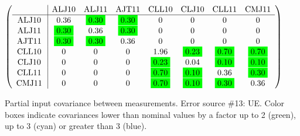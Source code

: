 \begin{table}[H]
\scriptsize
\begin{center}
\renewcommand{\arraystretch}{1.1}
\begin{math}\left(\begin{array}{c|ccccccc}
 & \mathrm{ALJ10} & 
\mathrm{ALJ11} & 
\mathrm{AJT11} & 
\mathrm{CLL10} & 
\mathrm{CLJ10} & 
\mathrm{CLL11} & 
\mathrm{CMJ11} \\
\hline
\mathrm{ALJ10} \hspace*{2pt} &       0.36 &  \colorbox{Green1}{$      0.30$} &  \colorbox{Green1}{$      0.30$} &  0 &  0 &  0 &  0 \\
\mathrm{ALJ11} \hspace*{2pt} &  \colorbox{Green1}{$      0.30$} &       0.36 &  \colorbox{Green1}{$      0.30$} &  0 &  0 &  0 &  0 \\
\mathrm{AJT11} \hspace*{2pt} &  \colorbox{Green1}{$      0.30$} &  \colorbox{Green1}{$      0.30$} &       0.36 &  0 &  0 &  0 &  0 \\
\mathrm{CLL10} \hspace*{2pt} &  0 &  0 &  0 &       1.96 &  \colorbox{Green1}{$      0.23$} &  \colorbox{Green1}{$      0.70$} &  \colorbox{Green1}{$      0.70$} \\
\mathrm{CLJ10} \hspace*{2pt} &  0 &  0 &  0 &  \colorbox{Green1}{$      0.23$} &       0.04 &  \colorbox{Green1}{$      0.10$} &  \colorbox{Green1}{$      0.10$} \\
\mathrm{CLL11} \hspace*{2pt} &  0 &  0 &  0 &  \colorbox{Green1}{$      0.70$} &  \colorbox{Green1}{$      0.10$} &       0.36 &  \colorbox{Green1}{$      0.30$} \\
\mathrm{CMJ11} \hspace*{2pt} &  0 &  0 &  0 &  \colorbox{Green1}{$      0.70$} &  \colorbox{Green1}{$      0.10$} &  \colorbox{Green1}{$      0.30$} &       0.36 \\
\end{array}\right)\end{math}
\caption{Partial input covariance between measurements. Error source \#13: UE. Color boxes indicate covariances lower than nominal values by a factor up to 2 (green), up to 3 (cyan) or greater than 3 (blue).}
\renewcommand{\arraystretch}{1}
\end{center}
\end{table}
